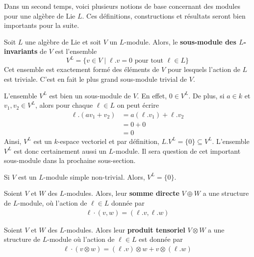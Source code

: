 Dans un second temps, voici plusieurs notions de base concernant des modules pour une algèbre de Lie $L$. Ces définitions, constructions et résultats seront bien importants pour la suite.

\begin{Def} \label{invariants} Soit $L$ une algèbre de Lie et soit $V$ un $L$-module. Alors, le \textbf{sous-module des $L$-invariants} de $V$ est l'ensemble 
$$ V^L = \{v \in V \; | \; \ell.v = 0 \text{ pour tout } \ell \in L\} $$
Cet ensemble est exactement formé des éléments de $V$ pour lesquels l'action de $L$ est triviale. C'est en fait le plus grand sous-module trivial de $V$.
\end{Def}

L'ensemble $V^L$ est bien un sous-module de $V$. En effet, $0 \in V^L$. De plus, si $a \in k$ et $v_1,v_2 \in V^L$, alors pour chaque $\ell \in L$ on peut écrire
\begin{align*}
\ell.(av_1+v_2) &= a(\ell.v_1)+\ell.v_2 \\
&= 0 + 0 \\
&= 0
\end{align*}
Ainsi, $V^L$ est un $k$-espace vectoriel et par définition, $L.V^L = \{0\} \subseteq V^L$. L'ensemble $V^L$ est donc certainement aussi un $L$-module. Il sera question de cet important sous-module dans la prochaine sous-section.

\begin{Rem} Si $V$ est un $L$-module simple non-trivial. Alors, $V^L = \{0\}$.
\end{Rem}

\begin{Def} Soient $V$ et $W$ des $L$-modules. Alors, leur \textbf{somme directe} $V \oplus W$ a une structure de $L$-module, où l'action de $\ell \in L$ donnée par
\begin{align*}
\ell \cdot (v,w) = (\ell.v,\ell.w)
\end{align*}
\end{Def}

\begin{Def} Soient $V$ et $W$ des $L$-modules. Alors leur \textbf{produit tensoriel} $V \otimes W$ a une structure de $L$-module où l'action de $\ell \in L$ est donnée par
\begin{align*}
\ell \cdot (v \otimes w) = (\ell.v) \otimes w +v \otimes (\ell.w)
\end{align*}
\end{Def}

